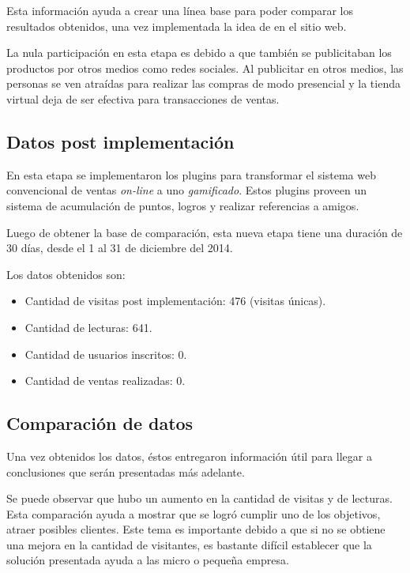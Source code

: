 Esta información ayuda a crear una línea base para poder comparar los
resultados obtenidos, una vez implementada la idea de {\GAM} en el sitio web.

La nula participación en esta etapa es debido a que también se publicitaban
los productos por otros medios como redes sociales. Al publicitar en otros medios, 
las personas se ven atraídas para realizar las compras de modo presencial y la 
tienda virtual deja de ser efectiva para transacciones de ventas.

\subsection{Datos post implementación {\GAM}}

En esta etapa se implementaron los plugins para transformar el sistema web
convencional de ventas \emph{on-line} a uno \emph{gamificado}.
Estos plugins proveen un sistema de acumulación de puntos,
logros y realizar referencias a amigos.

Luego de obtener la base de comparación, esta nueva etapa tiene una duración
de 30 días, desde el 1 al 31 de diciembre del 2014.

Los datos obtenidos son:

\begin{itemize}
    \item Cantidad de visitas post implementación: 476 (visitas únicas).
    \item Cantidad de lecturas: 641.
    \item Cantidad de usuarios inscritos: 0.
    \item Cantidad de ventas realizadas: 0.
\end{itemize}

\subsection{Comparación de datos}

Una vez obtenidos los datos, éstos entregaron información útil para llegar a
conclusiones que serán presentadas más adelante.

Se puede observar que hubo un aumento en la cantidad de visitas y de lecturas.
Esta comparación ayuda a mostrar que se logró cumplir uno de los objetivos,
atraer posibles clientes.
Este tema es importante debido a que si no se obtiene una mejora en la cantidad
de visitantes, es bastante difícil establecer que la solución presentada ayuda
a las micro o pequeña empresa.

